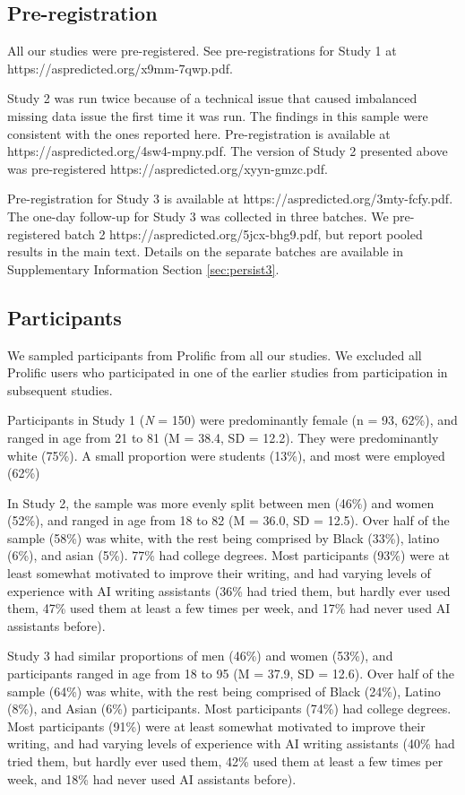 \documentclass[11pt]{report}
\begin{document}
\begin{mainf}
\subsection{Pre-registration}
All our studies were pre-registered. See pre-registrations for Study 1 at https://aspredicted.org/x9mm-7qwp.pdf. 

Study 2 was run twice because of a technical issue that caused imbalanced missing data issue the first time it was run. 
  The findings in this sample were consistent with the ones reported here. 
  Pre-registration is available at https://aspredicted.org/4sw4-mpny.pdf. 
  The version of Study 2 presented above was pre-registered https://aspredicted.org/xyyn-gmzc.pdf. 

Pre-registration for Study 3 is available at https://aspredicted.org/3mty-fcfy.pdf. 
  The one-day follow-up for Study 3 was collected in three batches. 
  We pre-registered batch 2 https://aspredicted.org/5jcx-bhg9.pdf, but report pooled results in the main text. 
  Details on the separate batches are available in Supplementary Information Section \ref{sec:persist3}.

\subsection{Participants}
We sampled participants from Prolific from all our studies. We excluded all Prolific users who participated in one of the earlier studies from participation in subsequent studies. 

Participants in Study 1 (\textit{N} = 150) were predominantly female (n = 93, 62\%), and ranged in age from 21 to 81 (M = 38.4, SD = 12.2). They were predominantly white (75\%). A small proportion were students (13\%), and most were employed (62\%)

In Study 2, the sample was more evenly split between men (46\%) and women (52\%), and ranged in age from 18 to 82 (M = 36.0, SD = 12.5). Over half of the sample (58\%) was white, with the rest being comprised by Black (33\%), latino (6\%), and asian (5\%). 77\% had college degrees. Most participants (93\%) were at least somewhat motivated to improve their writing, and had varying levels of experience with AI writing assistants (36\% had tried them, but hardly ever used them, 47\% used them at least a few times per week, and 17\% had never used AI assistants before).

Study 3 had similar proportions of men (46\%) and women (53\%), and participants ranged in age from 18 to 95 (M = 37.9, SD = 12.6). Over half of the sample (64\%) was white, with the rest being comprised of Black (24\%), Latino (8\%), and Asian (6\%) participants. Most participants (74\%) had college degrees. Most participants (91\%) were at least somewhat motivated to improve their writing, and had varying levels of experience with AI writing assistants (40\% had tried them, but hardly ever used them, 42\% used them at least a few times per week, and 18\% had never used AI assistants before).


\end{mainf}
\end{document}
